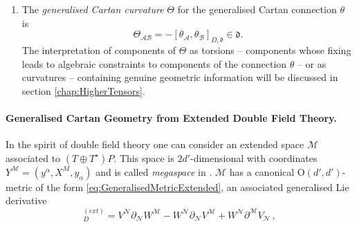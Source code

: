 \documentclass[11pt,a4paper]{article}
\numberwithin{equation}{section}
\begin{document}
\begin{enumerate}
    Similar to the ordinary Cartan geometry, for the case where $\mathfrak{d}$ is a generalisation of the Poincar\'e algebra, one can assume that the corresponding derivatives commute 
\begin{equation}
  [D_M , D_N] = f_{\alpha MN} \tilde{\partial}^\alpha = 0, \label{eq:GeneralisedPoincareType}
\end{equation}   
such that they can be identify with the flat derivatives $\partial_M$ related to the extended coordinates $X^M$ on $M$. This also means that, for the model algebras of what we call being 'generalised Poincar\'e type', $\mathfrak{d}$-valued fields over $M$ together with $[ \ , \ ]_{D,\mathfrak{d}}$ define a (non-exact) \textit{Courant algebroid} over $M$.

    \item The \textit{generalised Cartan curvature} $\Theta$ for the generalised Cartan connection $\theta$ is
        \begin{equation}
            \Theta_{\mathcal{AB}} = - [\theta_{\mathcal{A}} , \theta_{\mathcal{B}} ]_{D,\mathfrak{d}} \in \mathfrak{d}. \label{eq:GeneralisedCartanCurvatureNormal}
        \end{equation}
        The interpretation of components of $\Theta$ as torsions -- components whose fixing leads to algebraic constraints to components of the connection $\theta$ -- or as curvatures -- containing genuine geometric information will be discussed in section \ref{chap:HigherTensors}.
\end{enumerate}


\paragraph{Generalised Cartan Geometry from Extended Double Field Theory.} In the spirit of double field theory one can consider an extended space $\mathcal{M}$ associated to $(T \oplus T^\star)P$. This space is $2d'$-dimensional with coordinates $Y^{\mathcal{M}} = (y^\alpha , X^M , y_\alpha)$ and is called \textit{megaspace} in \cite{Butter:2022iza}. $\mathcal{M}$ has a canonical O$(d',d')$-metric of the form \eqref{eq:GeneralisedMetricExtended}, an associated generalised Lie derivative
\begin{equation}
	[V,W]_D^{(ext)} = V^{\mathcal{N}} \partial_{\mathcal{N}} W^{\mathcal{M}} - W^{\mathcal{N}} \partial_{\mathcal{N}} V^{\mathcal{M}} + W^{\mathcal{N}} \partial^{\mathcal{M}} V_{\mathcal{N}}\,,  \label{eq:MegaExtendedGeneralisedLieDerivative}
\end{equation}
\end{document}
